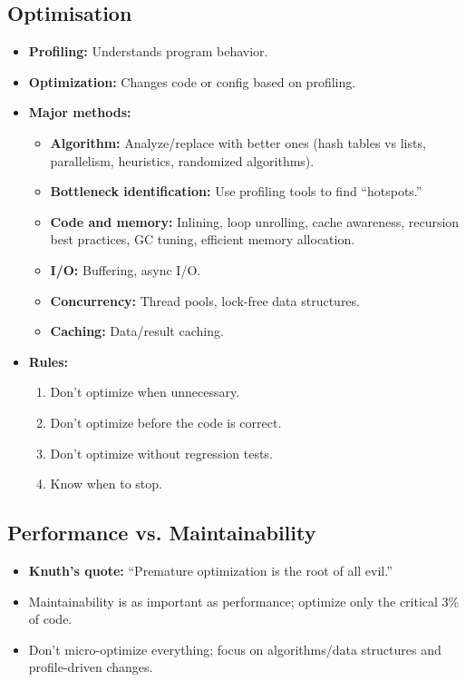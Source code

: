 \documentclass[11pt,a4paper]{article}
\begin{document}
\subsection*{Optimisation}
\begin{itemize}
    \item \textbf{Profiling:} Understands program behavior.
    \item \textbf{Optimization:} Changes code or config based on profiling.
    \item \textbf{Major methods:}
        \begin{itemize}
            \item \textbf{Algorithm:} Analyze/replace with better ones (hash tables vs lists, parallelism, heuristics, randomized algorithms).
            \item \textbf{Bottleneck identification:} Use profiling tools to find “hotspots.”
            \item \textbf{Code and memory:} Inlining, loop unrolling, cache awareness, recursion best practices, GC tuning, efficient memory allocation.
            \item \textbf{I/O:} Buffering, async I/O.
            \item \textbf{Concurrency:} Thread pools, lock-free data structures.
            \item \textbf{Caching:} Data/result caching.
        \end{itemize}
    \item \textbf{Rules:}
        \begin{enumerate}
            \item Don’t optimize when unnecessary.
            \item Don’t optimize before the code is correct.
            \item Don’t optimize without regression tests.
            \item Know when to stop.
        \end{enumerate}
\end{itemize}

\subsection*{Performance vs. Maintainability}
\begin{itemize}
    \item \textbf{Knuth’s quote:} “Premature optimization is the root of all evil.”
    \item Maintainability is as important as performance; optimize only the critical 3\% of code.
    \item Don’t micro-optimize everything; focus on algorithms/data structures and profile-driven changes.
\end{itemize}
\end{document}
